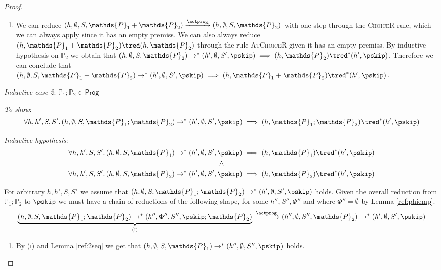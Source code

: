 \begin{thm}
{\begin{proof}
\begin{enumerate}
	\item We can reduce $(h, \emptyset, S, \mathds{P}_1 + \mathds{P}_2) \xrightarrow{\actprog} (h, \emptyset, S, \mathds{P}_2)$ with one step through the \textsc{ChoiceR} rule, which we can always apply since it has an empty premiss. We can also always reduce $(h, \mathds{P}_1 + \mathds{P}_2) \tred (h, \mathds{P}_2)$ through the rule \textsc{AtChoiceR} given it has an empty premiss. By inductive hypothesis on $\mathds{P}_2$ we obtain that $(h, \emptyset, S, \mathds{P}_2) \rightarrow^* (h', \emptyset, S', \pskip) \implies (h, \mathds{P}_2) \tred^* (h', \pskip)$. Therefore we can conclude that $(h, \emptyset, S, \mathds{P}_1 + \mathds{P}_2) \rightarrow^* (h', \emptyset, S', \pskip) \implies  (h, \mathds{P}_1 + \mathds{P}_2) \tred^* (h', \pskip)$. \\
\end{enumerate}
\indline
\textit{Inductive case 2}: $\mathds{P}_1 ; \mathds{P}_2 \in \mathsf{Prog}$

\textit{To show}:
\[
	\forall h, h', S, S' \ldotp
	(h, \emptyset, S, \mathds{P}_1 ; \mathds{P}_2) \rightarrow^* (h', \emptyset, S', \pskip) \implies 
	(h, \mathds{P}_1 ; \mathds{P}_2 ) \tred^* (h', \pskip)
\]

\textit{Inductive hypothesis}:
\begin{gather*}
	\forall h, h', S, S' \ldotp
	(h, \emptyset, S, \mathds{P}_1) \rightarrow^* (h', \emptyset, S', \pskip) \implies 
	(h, \mathds{P}_1) \tred^* (h', \pskip)
	\\ \land \\
	\forall h, h', S, S' \ldotp
	(h, \emptyset, S, \mathds{P}_2) \rightarrow^* (h', \emptyset, S', \pskip) \implies 
	(h, \mathds{P}_2) \tred^* (h', \pskip)
\end{gather*}

For arbitrary $h, h', S, S'$ we assume that $(h, \emptyset, S, \mathds{P}_1 ; \mathds{P}_2) \rightarrow^* (h', \emptyset, S', \pskip)$ holds. Given the overall reduction from $\mathds{P}_1 ; \mathds{P}_2$ to $\pskip$ we must have a chain of reductions of the following shape, for some $h'', S'', \Phi''$ and where $\Phi'' = \emptyset$ by Lemma \ref{ref:phiemp}.
\[
	\underbrace{(h, \emptyset, S, \mathds{P}_1 ; \mathds{P}_2) \rightarrow^* (h'', \Phi'', S'', \pskip; \mathds{P}_2)}_{(\textsc{i})}
	\xrightarrow{\actprog} (h'', \emptyset, S'', \mathds{P}_2) \rightarrow^* (h', \emptyset, S', \pskip)
\]
\begin{enumerate}
	\item \label{seq:1} By (\textsc{i}) and Lemma \ref{ref:2seq} we get that $(h, \emptyset, S, \mathds{P}_1) \rightarrow^* (h'', \emptyset, S'', \pskip)$ holds.
	

\end{enumerate}
\end{proof}}
\end{thm}
